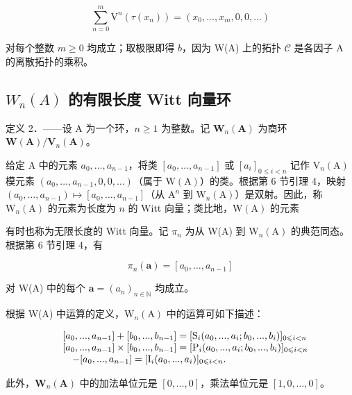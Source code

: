 \[
\sum_ {n = 0} ^ {m} \mathrm{V} ^ {n} (\tau (x _ {n})) = (x _ {0},..., x _ {m}, 0, 0,...)
\]

对每个整数 \(m \geqslant 0\) 均成立；取极限即得 \(b\)，因为 W(A) 上的拓扑 \(\mathcal{C}\) 是各因子 A 的离散拓扑的乘积。

\subsection{\texorpdfstring{\(W_{n}(A)\) 的有限长度 Witt 向量环}{W\_\{n\}(A) 的有限长度 Witt 向量环}}

定义 2．——设 A 为一个环，\(n \geqslant 1\) 为整数。记 \(\mathbf{W}_{n}(\mathbf{A})\) 为商环 \(\mathbf{W}(\mathbf{A}) / \mathbf{V}_{n}(\mathbf{A})\)。

给定 A 中的元素 \(a_0, \ldots, a_{n-1}\)，将类 \([a_0, \ldots, a_{n-1}]\) 或 \([a_i]_{0 \leq i < n}\) 记作 \(\mathrm{V}_n(\mathrm{A})\) 模元素 \((a_0, \ldots, a_{n-1}, 0, 0, \ldots)\)（属于 \(\mathrm{W}(\mathrm{A})\)）的类。根据第 6 节引理 4，映射 \((a_0, \ldots, a_{n-1}) \mapsto [a_0, \ldots, a_{n-1}]\)（从 \(\mathrm{A}^n\) 到 \(\mathrm{W}_n(\mathrm{A})\)）是双射。因此，称 \(\mathrm{W}_n(\mathrm{A})\) 的元素为长度为 \(n\) 的 Witt 向量；类比地，\(\mathrm{W}(\mathrm{A})\) 的元素

有时也称为无限长度的 Witt 向量。记 \(\pi_n\) 为从 W(A) 到 \(\mathrm{W}_n(\mathrm{A})\) 的典范同态。根据第 6 节引理 4，有

\[
\pi_ {n} (\boldsymbol {a}) = [ a _ {0}, \dots , a _ {n - 1} ]\tag{42}
\]

对 W(A) 中的每个 \(\boldsymbol{a} = (a_{n})_{n \in \mathbb{N}}\) 均成立。

根据 W(A) 中运算的定义，\(\mathrm{W}_{n}(\mathrm{A})\) 中的运算可如下描述：

\[
\begin{array}{r l} & {[ a _ {0},..., a _ {n - 1} ] + [ b _ {0},..., b _ {n - 1} ] = [ \mathrm{S} _ {i} (a _ {0},..., a _ {i}; b _ {0},..., b _ {i}) ] _ {0 \leqslant i <   n}} \\ & {[ a _ {0},..., a _ {n - 1} ] \times [ b _ {0},..., b _ {n - 1} ] = [ \mathrm{P} _ {i} (a _ {0},..., a _ {i}; b _ {0},..., b _ {i}) ] _ {0 \leqslant i <   n}} \\ & {\quad - [ a _ {0},..., a _ {n - 1} ] = [ \mathrm{I} _ {i} (a _ {0},..., a _ {i}) ] _ {0 \leqslant i <   n}.} \end{array}
\]

此外，\(\mathbf{W}_{n}(\mathbf{A})\) 中的加法单位元是 \([0,\dots,0]\)，乘法单位元是 \([1,0,\dots,0]\)。

